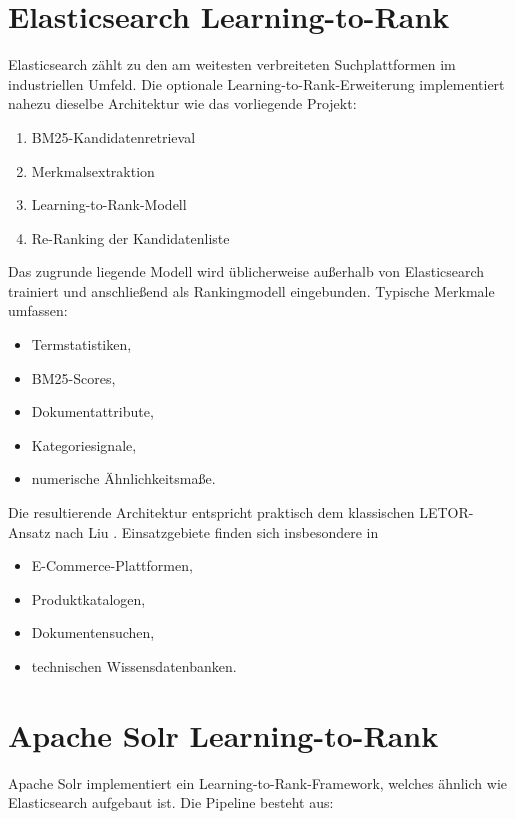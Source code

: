 \section{Elasticsearch Learning-to-Rank}

Elasticsearch zählt zu den am weitesten verbreiteten Suchplattformen im industriellen Umfeld.
Die optionale Learning-to-Rank-Erweiterung implementiert nahezu dieselbe Architektur wie das vorliegende Projekt:

\begin{enumerate}
  \item BM25-Kandidatenretrieval
  \item Merkmalsextraktion
  \item Learning-to-Rank-Modell
  \item Re-Ranking der Kandidatenliste
\end{enumerate}

Das zugrunde liegende Modell wird üblicherweise außerhalb von Elasticsearch trainiert und anschließend als Rankingmodell eingebunden.
Typische Merkmale umfassen:

\begin{itemize}
  \item Termstatistiken,
  \item BM25-Scores,
  \item Dokumentattribute,
  \item Kategoriesignale,
  \item numerische Ähnlichkeitsmaße.
\end{itemize}

Die resultierende Architektur entspricht praktisch dem klassischen LETOR-Ansatz nach Liu \cite{liu2009learning}.
Einsatzgebiete finden sich insbesondere in

\begin{itemize}
  \item E-Commerce-Plattformen,
  \item Produktkatalogen,
  \item Dokumentensuchen,
  \item technischen Wissensdatenbanken.
\end{itemize}

\section{Apache Solr Learning-to-Rank}

Apache Solr implementiert ein Learning-to-Rank-Framework, welches ähnlich wie Elasticsearch aufgebaut ist.
Die Pipeline besteht aus:

